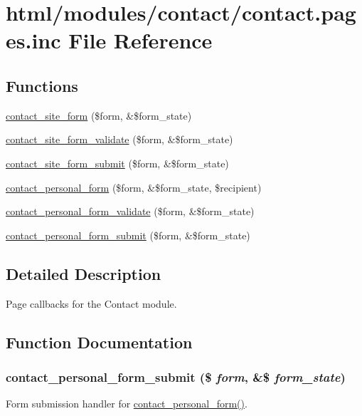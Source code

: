 \hypertarget{contact_8pages_8inc}{
\section{html/modules/contact/contact.pages.inc File Reference}
\label{contact_8pages_8inc}
}
\subsection*{Functions}
\begin{DoxyCompactItemize}
\item 
\hyperlink{group__forms_gabc4466031f99ab64b6b65e4fdbf4291d}{contact\_\-site\_\-form} (\$form, \&\$form\_\-state)
\item 
\hyperlink{contact_8pages_8inc_a548e38faaf205c6ac81ad3c91c7f7de1}{contact\_\-site\_\-form\_\-validate} (\$form, \&\$form\_\-state)
\item 
\hyperlink{contact_8pages_8inc_a270bdc78a9bbba16b7f4efe1cbe1cc4d}{contact\_\-site\_\-form\_\-submit} (\$form, \&\$form\_\-state)
\item 
\hyperlink{group__forms_ga7dfdb8ed0a4456f0f2070b6efd64f280}{contact\_\-personal\_\-form} (\$form, \&\$form\_\-state, \$recipient)
\item 
\hyperlink{contact_8pages_8inc_aae358ed0604f1e51cb6d1a1e830f81fd}{contact\_\-personal\_\-form\_\-validate} (\$form, \&\$form\_\-state)
\item 
\hyperlink{contact_8pages_8inc_a51522c699a24af2fb7fb613c3a0dd6e4}{contact\_\-personal\_\-form\_\-submit} (\$form, \&\$form\_\-state)
\end{DoxyCompactItemize}


\subsection{Detailed Description}
Page callbacks for the Contact module. 

\subsection{Function Documentation}
\hypertarget{contact_8pages_8inc_a51522c699a24af2fb7fb613c3a0dd6e4}{
\subsubsection[{contact\_\-personal\_\-form\_\-submit}]{\setlength{\rightskip}{0pt plus 5cm}contact\_\-personal\_\-form\_\-submit (\$ {\em form}, \/  \&\$ {\em form\_\-state})}}
\label{contact_8pages_8inc_a51522c699a24af2fb7fb613c3a0dd6e4}
Form submission handler for \hyperlink{group__forms_ga7dfdb8ed0a4456f0f2070b6efd64f280}{contact\_\-personal\_\-form()}.

